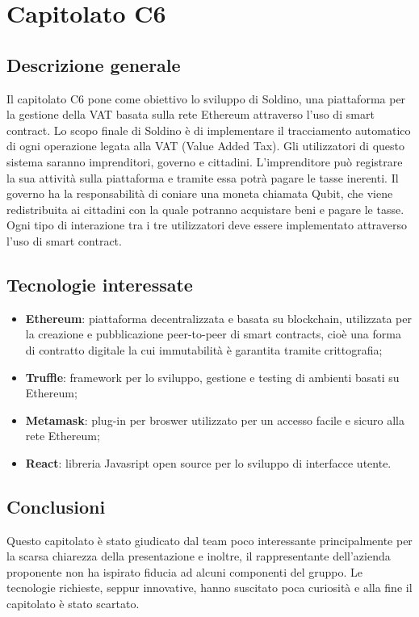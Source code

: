 \documentclass[11pt,a4paper]{article}
\begin{document}
\section{Capitolato C6}
\subsection{Descrizione generale}
Il capitolato C6 pone come obiettivo lo sviluppo di Soldino, una piattaforma per la gestione della
VAT basata sulla rete Ethereum attraverso l'uso di smart contract.
Lo scopo finale di Soldino è di implementare il tracciamento automatico di ogni operazione legata
alla VAT (Value Added Tax).
Gli utilizzatori di questo sistema saranno imprenditori, governo e cittadini. L'imprenditore può
registrare la sua attività sulla piattaforma e tramite essa potrà pagare le tasse inerenti. Il governo ha la responsabilità di coniare una moneta chiamata Qubit, che viene
redistribuita ai cittadini con la quale potranno acquistare beni e pagare le tasse. Ogni tipo di
interazione tra i tre utilizzatori deve essere implementato attraverso l'uso di smart contract.
\subsection{Tecnologie interessate}
\begin{itemize}
\item \textbf{Ethereum}: piattaforma decentralizzata e basata su blockchain, utilizzata per la creazione e pubblicazione peer-to-peer di smart contracts, cioè una forma di contratto digitale la cui immutabilità è garantita tramite crittografia;
\item \textbf{Truffle}: framework per lo sviluppo, gestione e testing di ambienti basati su Ethereum;
\item \textbf{Metamask}: plug-in per broswer utilizzato per un accesso facile e sicuro alla rete Ethereum;
\item \textbf{React}: libreria Javasript open source per lo sviluppo di interfacce utente.
\end{itemize}
\subsection{Conclusioni}
Questo capitolato è stato giudicato dal team poco interessante principalmente per la scarsa chiarezza della presentazione e inoltre, il rappresentante dell'azienda proponente non ha ispirato fiducia ad alcuni componenti del gruppo. Le tecnologie richieste, seppur innovative, hanno suscitato poca curiosità e alla fine il capitolato è stato scartato.
	
\end{document}
